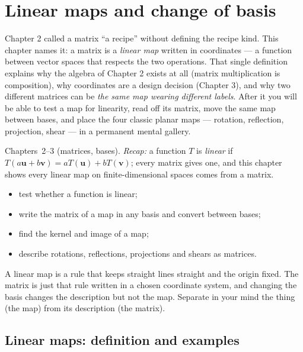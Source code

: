 \chapter{Linear maps and change of basis}\label{ch:maps}

Chapter 2 called a matrix ``a recipe'' without defining the recipe kind. This chapter names it: a matrix is a \emph{linear map} written in coordinates — a function between vector spaces that respects the two operations. That single definition explains why the algebra of Chapter 2 exists at all (matrix multiplication is composition), why coordinates are a design decision (Chapter 3), and why two different matrices can be \emph{the same map wearing different labels}. After it you will be able to test a map for linearity, read off its matrix, move the same map between bases, and place the four classic planar maps — rotation, reflection, projection, shear — in a permanent mental gallery.

\begin{rulebox}
Chapters~2--3 (matrices, bases). \emph{Recap:} a function $T$ is \emph{linear} if $T(a\mathbf u+b\mathbf v)=aT(\mathbf u)+bT(\mathbf v)$; every matrix gives one, and this chapter shows every linear map on finite-dimensional spaces comes from a matrix.
\end{rulebox}
\begin{wins}
\begin{itemize}
\item test whether a function is linear;
\item write the matrix of a map in any basis and convert between bases;
\item find the kernel and image of a map;
\item describe rotations, reflections, projections and shears as matrices.
\end{itemize}
\end{wins}
\begin{principle}
A linear map is a rule that keeps straight lines straight and the origin fixed. The matrix is just that rule written in a chosen coordinate system, and changing the basis changes the description but not the map. Separate in your mind the thing (the map) from its description (the matrix).
\end{principle}

\section{Linear maps: definition and examples}\label{sec:linmaps}

